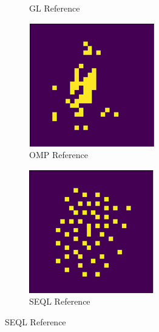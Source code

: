 \documentclass[a4paper,twocolumn]{article} %
\begin{document}
\begin{figure}[h!]
\begin{subfigure}[t]{0.23\linewidth}
        \caption*{GL Reference}
    \end{subfigure}
    \hfill
    \begin{subfigure}[t]{0.23\linewidth}
        \includegraphics[width=\linewidth]{figures/reference_features_omp.png}
        \caption*{OMP Reference}
    \end{subfigure}
    \hfill
    \begin{subfigure}[t]{0.23\linewidth}
        \includegraphics[width=\linewidth]{figures/reference_features_seql.png}
        \caption*{SEQL Reference}
    \end{subfigure}


\end{figure}
\end{document}
